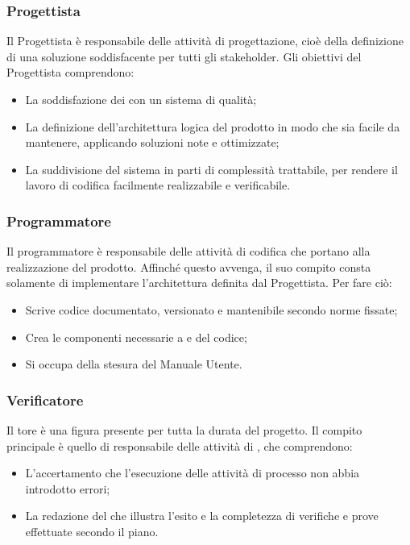 \documentclass[NormeDiProgetto.tex]{subfiles}
\begin{document}
	\subsubsection{Progettista}
	Il Progettista è responsabile delle attività di progettazione, cioè della definizione di una soluzione soddisfacente per tutti gli stakeholder. Gli obiettivi del Progettista comprendono:
	\begin{itemize}
		\item La soddisfazione dei  con un sistema di qualità;
		\item La definizione dell'architettura logica del prodotto in modo che sia facile da mantenere, applicando soluzioni note e ottimizzate;
		\item La suddivisione del sistema in parti di complessità trattabile, per rendere il lavoro di codifica facilmente realizzabile e verificabile.
	\end{itemize} 

	\subsubsection{Programmatore}
	Il programmatore è responsabile delle attività di codifica che portano alla realizzazione del prodotto. Affinché questo avvenga, il suo compito consta solamente di implementare l'architettura definita dal Progettista. Per fare ciò:
	\begin{itemize}
		\item Scrive codice documentato, versionato e mantenibile secondo norme fissate;
		\item Crea le componenti necessarie a  e  del codice;
		\item Si occupa della stesura del Manuale Utente.
	\end{itemize}

	\subsubsection{Verificatore}
	Il tore è una figura presente per tutta la durata del progetto. Il compito principale è quello di responsabile delle attività di , che comprendono:
	\begin{itemize}
	\item L'accertamento che l'esecuzione delle attività di processo non abbia introdotto errori;
	\item La redazione del \pdq{} che illustra l'esito e la completezza di verifiche e prove effettuate secondo il piano.
	\end{itemize}
	
\end{document}
